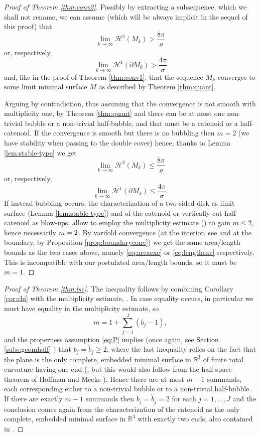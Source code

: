 \documentclass[JEP,XML,SOM,Unicode]{cedram}
\newcounter{cas}
\theoremstyle{definition}
\newcommand{\R}{\mathbb{R}}
\newcommand{\h}{\mathscr{H}}
\begin{document}
\begin{proof} [Proof of Theorem \ref{thm:conv2}]
Possibly by extracting a subsequence, which we shall not rename, we can assume (which will be always implicit in the sequel of this proof) that
\[
\lim_{k\to\infty}\h^2(M_k)> \frac{8 \pi}{\varrho}
\]
or, respectively,
\[
\lim_{k\to\infty}\h^1(\partial M_k)>\frac{4\pi}{\sigma}
\]
and, like in the proof of Theorem \ref{thm:conv1}, that the sequence $M_k$ converges to some limit minimal surface $M$ as described by Theorem \ref{thm:quant}.

Arguing by contradiction, thus assuming that the convergence is not smooth with multiplicity one, by Theorem \ref{thm:quant} and \cite[Lem.\,12]{ABCS18} there can be at most one non-trivial bubble or a non-trivial half-bubble, and that must be a catenoid or a half-catenoid. If the convergence is smooth but there is no bubbling then $m=2$ (we have stability when passing to the double cover) hence, thanks to Lemma \ref{lem:stable-type} we get
\begin{equation}\label{eq:areaexc}
\lim_{k\to\infty}\h^2(M_k)\leq \frac{8 \pi}{\varrho}
\end{equation}
or, respectively,
\begin{equation}\label{eq:lengthexc}
\lim_{k\to\infty}\h^1(\partial M_k)\leq \frac{4\pi}{\sigma}.
\end{equation}
If instead bubbling occurs, the characterization of a two-sided disk as limit surface (\cf Lemma \ref{lem:stable-type}) and of the catenoid or vertically cut half-catenoid as blow-ups, allow to employ the multiplicity estimate
(\cite[Prop.\,13]{ABCS18})
to gain $m\leq 2$, hence necessarily $m=\nobreak2$.
By varifold convergence (at the interior, see \cite{ACS17} and at the boundary, by Proposition \ref{prop:boundaryconv}) we get the same area/length bounds as the two cases above, namely \eqref{eq:areaexc} or \eqref{eq:lengthexc} respectively.
This is incompatible with our postulated area/length bounds, so it must be $m=1$.
\end{proof}

\begin{proof}[Proof of Theorem \ref{thm:lsc}]
The inequality follows by combining Corollary \ref{cor:chi} with the multiplicity estimate, \cite[Prop.\,13]{ABCS18}.
In case equality occurs, in particular we must have equality in the multiplicity estimate, so
\[
m=1+\sum_{j=1}^J(b_j-1),
\]
and the properness assumption \eqref{eq:P} implies (once again, see Section \ref{subs:geomhalf} ) that $b_j=\check{b}_j\geq 2$, where the last inequality relies on the fact that the plane is the only complete, embedded minimal surface in $\R^3$ of finite total curvature having one end (\cf \cite{Sc83}, but this would also follow from the half-space theorem of Hoffman and Meeks \cite{HM90}). Hence there are at most $m-1$ summands, each corresponding either to a non-trivial bubble or to a non-trivial half-bubble. If there are exactly $m-1$ summands then $b_j=\check{b}_j=2$ for each $j=1,\ldots, J$ and the conclusion comes again from the characterization of the catenoid as the only complete, embedded minimal surface in $\R^3$ with exactly two ends, also contained in \cite{Sc83}.
\end{proof}
\end{document}

